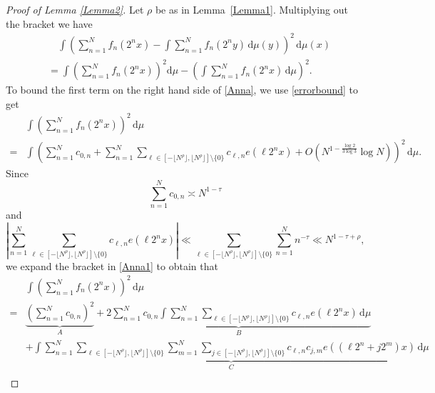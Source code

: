\documentclass[10pt,a4paper]{amsart}
\numberwithin{equation}{section} %
\begin{document}
\begin{proof}[Proof of Lemma \ref{Lemma2}]
	Let $\rho$ be as in Lemma~\ref{Lemma1}. Multiplying out the bracket we have 
    \begin{equation}\label{Anna}
    \begin{aligned} 
		&\quad\int \left(\sum_{n=1}^{N}f_{n}(2^nx)-\int \sum_{n=1}^{N}f_{n}(2^ny)\,\mathrm{d} \mu(y) \right)^2\,\mathrm{d}\mu(x) \\
        &=\int\left( \sum_{n=1}^{N}f_{n}(2^nx)\right)^2 \mathrm{d}\mu-\left( \int \sum_{n=1}^{N}f_{n}(2^nx)\, \mathrm{d}\mu\right)^2.
	\end{aligned}
     \end{equation}
	To bound the first term on the right hand side of \eqref{Anna}, we use \eqref{errorbound} to get
	\begin{align}
		\label{Anna1}
		&\int \left( \sum_{n=1}^{N}f_{n}(2^nx)\right)^2\, \mathrm{d}\mu\nonumber \\
		=&\int \left(\sum_{n=1}^{N}c_{0,n}+\sum_{n=1}^{N}\sum_{\ell\in [-\lfloor N^{ \rho}\rfloor,\lfloor N^{ \rho}\rfloor]\setminus \{0\}}c_{\ell,n}e(\ell 2^nx)+O\left(N^{1-\frac{\log2}{3\log3}}\log N\right)\right)^{2}\, \mathrm{d}\mu.
	\end{align} 
Since
	\begin{equation}
		\label{trivial1}
		\sum_{n=1}^{N}c_{0,n}\asymp N^{1-\tau}
	\end{equation}
	and
	\begin{equation*}
\left|\sum_{n=1}^{N}\sum_{\ell\in [-\lfloor N^{\rho}\rfloor,\lfloor N^{ \rho}\rfloor]\setminus \{0\}}c_{\ell,n}e(\ell 2^nx)\right|\ll \sum_{\ell\in [-\lfloor N^{\rho}\rfloor,\lfloor N^{ \rho}\rfloor]\setminus \{0\}}\sum_{n=1}^{N}n^{-\tau}\ll N^{1- \tau+\rho},
	\end{equation*}
we expand the bracket in \eqref{Anna1} to obtain that
	\begin{align*}
		&\int \left( \sum_{n=1}^{N}f_{n}(2^nx)\right)^2\, \mathrm{d}\mu\\
		=&\underbrace{\left(\sum_{n=1}^{N}c_{0,n}\right)^{2}}_{A}+\underbrace{2\sum_{n=1}^{N}c_{0,n}\int \sum_{n=1}^{N}\sum_{\ell\in [-\lfloor N^{\rho}\rfloor,\lfloor N^{ \rho}\rfloor]\setminus \{0\}}c_{\ell,n}e(\ell 2^nx)\, \mathrm{d}\mu}_{B}\\
		&+\underbrace{\int \sum_{n=1}^{N}\sum_{\ell \in [-\lfloor N^{ \rho}\rfloor,\lfloor N^{ \rho}\rfloor]\setminus\{0\}}\sum_{m=1}^{N}\sum_{j\in [-\lfloor N^{\rho}\rfloor,\lfloor N^{ \rho}\rfloor]\setminus\{0\}}c_{\ell,n}c_{j,m}e((\ell 2^n+j2^m)x)\, \mathrm{d}\mu}_{C}\\

\end{align*}
\end{proof}
\end{document}

